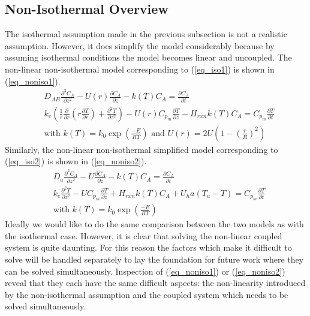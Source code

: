 \documentclass[11pt,fleqn]{article}
\theoremstyle{defstyle}
\begin{document}
\subsection{Non-Isothermal Overview}
\label{section_noniso}
The isothermal assumption made in the previous subsection is not a realistic assumption. However, it does simplify the model considerably because by assuming isothermal conditions the model becomes linear and uncoupled. The non-linear non-isothermal model corresponding to (\ref{eq_iso1}) is shown in (\ref{eq_noniso1}).
\begin{equation}
\begin{aligned}
&D_{AB} \frac{\partial^2 C_A}{\partial z^2} - U(r) \frac{\partial C_A}{\partial z} - k(T)C_A 
= \frac{\partial C_A}{\partial t} \\
& k_e\left(\frac{1}{r}\frac{\partial}{\partial r}\left(r\frac{\partial T}{\partial r}\right) + \frac{\partial ^2 T}{\partial z^2}\right) - U(r) C_{p_m} \frac{\partial T}{\partial z} - H_{rxn}k(T)C_A = C_{p_m} \frac{\partial T}{\partial t} \\
&\text{with } k(T) = k_0 \exp\left(\frac{-E}{RT}\right) \text{ and } U(r)=2U\left(1-\left(\frac{r}{R}\right)^2\right)
\end{aligned}
\label{eq_noniso1}
\end{equation} 
Similarly, the non-linear non-isothermal simplified model corresponding to (\ref{eq_iso2}) is shown in (\ref{eq_noniso2}).
\begin{equation}
\begin{aligned}
&D_a \frac{\partial^2 C_A}{\partial z^2} - U \frac{\partial C_A}{\partial z} - k(T)C_A 
= \frac{\partial C_A}{\partial t} \\
& k_e\frac{\partial^2 T}{\partial z^2}- U C_{p_m} \frac{\partial T}{\partial z} + H_{rxn}k(T)C_A  + U_ha(T_a-T) = C_{p_m} 
\frac{\partial T}{\partial t} \\
&\text{with } k(T) = k_0 \exp\left(\frac{-E}{RT}\right)
\end{aligned}
\label{eq_noniso2}
\end{equation} 
Ideally we would like to do the same comparison between the two models as with the isothermal case. However, it is clear that solving the non-linear coupled system is quite daunting. For this reason the factors which make it difficult to solve will be handled separately to lay the foundation for future work where they can be solved simultaneously. Inspection of (\ref{eq_noniso1}) or (\ref{eq_noniso2}) reveal that they each have the same difficult aspects: the non-linearity introduced by the non-isothermal assumption and the coupled system which needs to be solved simultaneously.
\end{document}
